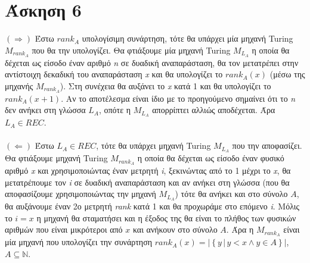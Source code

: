 \documentclass[11pt]{article}
\begin{document}

\section*{Άσκηση 6}
$(\Rightarrow)$ Έστω $rank_A$ υπολογίσιμη συνάρτηση, τότε θα υπάρχει μία μηχανή Turing $M_{rank_A}$ που θα την υπολογίζει. Θα φτιάξουμε μία μηχανή Turing $M_{L_A}$ η οποία θα δέχεται ως είσοδο έναν αριθμό \textit{n} σε δυαδική αναπαράσταση, θα τον μετατρέπει στην αντίστοιχη δεκαδική του αναπαράσταση \textit{x} και θα υπολογίζει το $rank_A(x)$ (μέσω της μηχανής $M_{rank_A}$). Στη συνέχεια θα αυξάνει το \textit{x} κατά 1 και θα υπολογίζει το $rank_A(x + 1)$. Αν το αποτέλεσμα είναι ίδιο με το προηγούμενο σημαίνει ότι το \textit{n} δεν ανήκει στη γλώσσα $L_A$, οπότε η $M_{L_A}$ απορρίπτει αλλιώς αποδέχεται. Άρα $L_A \in REC$.
\\
\\
$(\Leftarrow)$ Έστω $L_A \in REC$, τότε θα υπάρχει μηχανή Turing $M_{L_A}$ που την αποφασίζει. Θα φτιάξουμε μηχανή Turing $M_{rank_A}$ η οποία θα δέχεται ως είσοδο έναν φυσικό αριθμό \textit{x} και χρησιμοποιώντας έναν μετρητή \textit{i}, ξεκινώντας από το 1 μέχρι το \textit{x}, θα μετατρέπουμε τον \textit{i} σε δυαδική αναπαράσταση και αν ανήκει στη γλώσσα (που θα αποφασίζουμε χρησιμοποιώντας την μηχανή $M_{L_A}$) τότε θα ανήκει και στο σύνολο $A$, θα αυξάνουμε έναν 2ο μετρητή \textit{rank} κατά 1 και θα προχωράμε στο επόμενο \textit{i}. Μόλις το $i = x$ η μηχανή θα σταματήσει και η έξοδος της θα είναι το πλήθος των φυσικών αριθμών που είναι μικρότεροι από $x$ και ανήκουν στο σύνολο $A$. Άρα η $M_{rank_A}$ είναι μία μηχανή που υπολογίζει την συνάρτηση $rank_A(x) = |\left\lbrace y \, | \, y < x \land y \in A \right\rbrace |$, $A \subseteq \mathbb{N}$.



\end{document}
